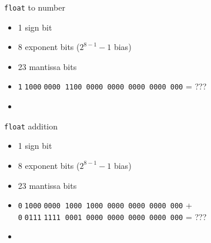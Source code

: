 \begin{frame}{\texttt{float} to number}
\begin{itemize}
\item 1 sign bit
\item 8 exponent bits ($2^{8-1}-1$ bias)
\item 23 mantissa bits
\vspace{.5cm}
\item {\fontsize{12}{13}\selectfont\texttt{1$\;$1000$\;$0000$\;\;$1100 0000 0000 0000 0000 000} = ???}
\item<2->
\iftoggle{heldback}{}{$-1.11\cdot 2^1 = -11.1 = -3.5_\text{TEN}$}
\end{itemize}
\end{frame}

\begin{frame}{\texttt{float} addition}
\begin{itemize}
\item 1 sign bit
\item 8 exponent bits ($2^{8-1}-1$ bias)
\item 23 mantissa bits
\vspace{.5cm}
\item {\fontsize{12}{13}\selectfont\texttt{0$\;$1000$\;$0000$\;\;$1000 1000 0000 0000 0000 000} + \\
      \texttt{0$\;$0111$\;$1111$\;\;$0001 0000 0000 0000 0000 000} = ???}
\item<2->
\iftoggle{heldback}{}{$1.10001\cdot2^1 + 1.0001\cdot2^0 = (11.0001+1.0001)\cdot2^0 = 100.0010\cdot2^0 = 4.125_\text{TEN}$}
\end{itemize}
\end{frame}
